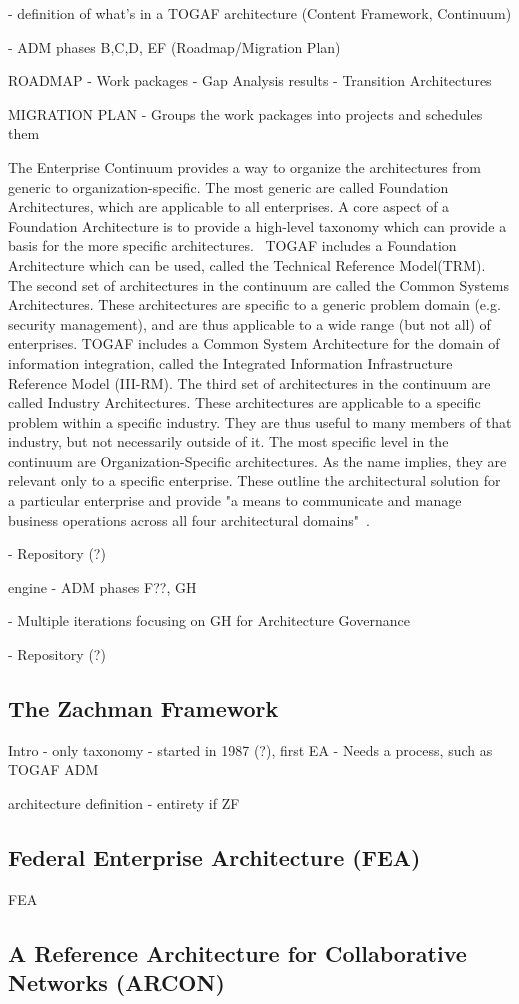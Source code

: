- definition of what's in a TOGAF architecture (Content Framework, Continuum)

- ADM phases B,C,D, EF (Roadmap/Migration Plan)

ROADMAP
- Work packages
- Gap Analysis results
- Transition Architectures

MIGRATION PLAN
- Groups the work packages into projects and schedules them

The Enterprise Continuum provides a way to organize the architectures from generic to organization-specific. The most generic are called Foundation Architectures, which are applicable to all enterprises. A core aspect of a Foundation Architecture is to provide a high-level taxonomy which can provide a basis for the more specific architectures.~\cite{togaf9.1} TOGAF includes a Foundation Architecture which can be used, called the Technical Reference Model(TRM). The second set of architectures in the continuum are called the Common Systems Architectures. These architectures are specific to a generic problem domain (e.g. security management), and are thus applicable to a wide range (but not all) of enterprises. TOGAF includes a Common System Architecture for the domain of information integration, called the Integrated Information Infrastructure Reference Model (III-RM). The third set of architectures in the continuum are called Industry Architectures. These architectures are applicable to a specific problem within a specific industry. They are thus useful to many members of that industry, but not necessarily outside of it. The most specific level in the continuum are Organization-Specific  architectures. As the name implies, they are relevant only to a specific enterprise. These outline the architectural solution for a particular enterprise and provide "a means to communicate and manage business operations across all four architectural domains"~\cite{togaf9.1}.

- Repository (?)


engine
- ADM phases F??, GH

- Multiple iterations focusing on GH for Architecture Governance

- Repository (?)


\subsection{The Zachman Framework}
Intro
- only taxonomy
- started in 1987 (?), first EA
- Needs a process, such as TOGAF ADM

architecture definition
- entirety if ZF

\subsection{Federal Enterprise Architecture (FEA)}
FEA

\subsection{A Reference Architecture for Collaborative Networks (ARCON)}
